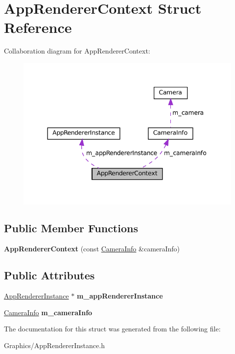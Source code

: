 \hypertarget{structAppRendererContext}{}\section{App\+Renderer\+Context Struct Reference}
\label{structAppRendererContext}


Collaboration diagram for App\+Renderer\+Context\+:
\nopagebreak
\begin{figure}[H]
\begin{center}
\leavevmode
\includegraphics[width=344pt]{structAppRendererContext__coll__graph}
\end{center}
\end{figure}
\subsection*{Public Member Functions}
\begin{DoxyCompactItemize}
\item 
\mbox{\label{structAppRendererContext_a19db4ff8090083fbc6150a818acc4ec2}} 
{\bfseries App\+Renderer\+Context} (const \hyperlink{structCameraInfo}{Camera\+Info} \&camera\+Info)
\end{DoxyCompactItemize}
\subsection*{Public Attributes}
\begin{DoxyCompactItemize}
\item 
\mbox{\label{structAppRendererContext_aefb7ea01003d765275701a26d9a037e9}} 
\hyperlink{classAppRendererInstance}{App\+Renderer\+Instance} $\ast$ {\bfseries m\+\_\+app\+Renderer\+Instance}
\item 
\mbox{\label{structAppRendererContext_aec7039b02cfe5358658ede445b68f33f}} 
\hyperlink{structCameraInfo}{Camera\+Info} {\bfseries m\+\_\+camera\+Info}
\end{DoxyCompactItemize}


The documentation for this struct was generated from the following file\+:\begin{DoxyCompactItemize}
\item 
Graphics/App\+Renderer\+Instance.\+h\end{DoxyCompactItemize}
